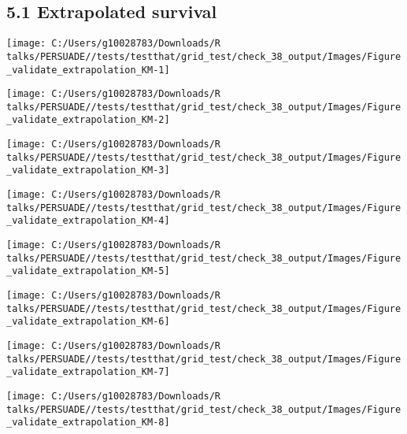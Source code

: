 \documentclass[
]{article}
\begin{document}
\subsection{5.1 Extrapolated survival}\label{extrapolated-survival}

\begin{flushleft}\texttt{[image: C:/Users/g10028783/Downloads/R talks/PERSUADE//tests/testthat/grid\_test/check\_38\_output/Images/Figure\_validate\_extrapolation\_KM-1]} \end{flushleft}

\begin{flushleft}\texttt{[image: C:/Users/g10028783/Downloads/R talks/PERSUADE//tests/testthat/grid\_test/check\_38\_output/Images/Figure\_validate\_extrapolation\_KM-2]} \end{flushleft}

\begin{flushleft}\texttt{[image: C:/Users/g10028783/Downloads/R talks/PERSUADE//tests/testthat/grid\_test/check\_38\_output/Images/Figure\_validate\_extrapolation\_KM-3]} \end{flushleft}

\begin{flushleft}\texttt{[image: C:/Users/g10028783/Downloads/R talks/PERSUADE//tests/testthat/grid\_test/check\_38\_output/Images/Figure\_validate\_extrapolation\_KM-4]} \end{flushleft}

\begin{flushleft}\texttt{[image: C:/Users/g10028783/Downloads/R talks/PERSUADE//tests/testthat/grid\_test/check\_38\_output/Images/Figure\_validate\_extrapolation\_KM-5]} \end{flushleft}

\begin{flushleft}\texttt{[image: C:/Users/g10028783/Downloads/R talks/PERSUADE//tests/testthat/grid\_test/check\_38\_output/Images/Figure\_validate\_extrapolation\_KM-6]} \end{flushleft}

\begin{flushleft}\texttt{[image: C:/Users/g10028783/Downloads/R talks/PERSUADE//tests/testthat/grid\_test/check\_38\_output/Images/Figure\_validate\_extrapolation\_KM-7]} \end{flushleft}

\begin{flushleft}\texttt{[image: C:/Users/g10028783/Downloads/R talks/PERSUADE//tests/testthat/grid\_test/check\_38\_output/Images/Figure\_validate\_extrapolation\_KM-8]} \end{flushleft}
\end{document}
